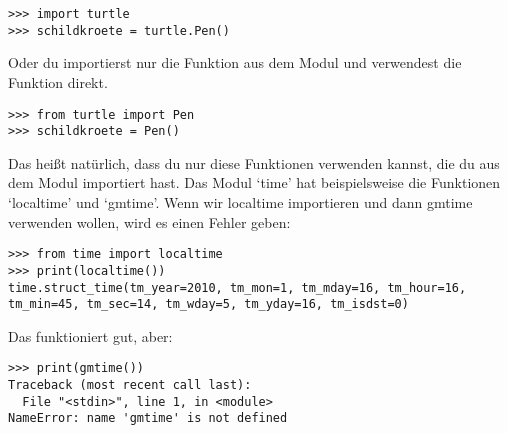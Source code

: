 \begin{Verbatim}[frame=single]
>>> import turtle
>>> schildkroete = turtle.Pen()
\end{Verbatim}

Oder du importierst nur die  Funktion aus dem Modul und verwendest die Funktion direkt.

\begin{Verbatim}[frame=single]
>>> from turtle import Pen
>>> schildkroete = Pen()
\end{Verbatim}

Das heißt natürlich, dass du nur diese Funktionen verwenden kannst, die du aus dem Modul importiert hast. Das Modul `time' hat beispielsweise die Funktionen `localtime' und `gmtime'. Wenn wir localtime importieren und dann gmtime verwenden wollen, wird es einen Fehler geben: 

\begin{Verbatim}[frame=single]
>>> from time import localtime
>>> print(localtime())
time.struct_time(tm_year=2010, tm_mon=1, tm_mday=16, tm_hour=16, 
tm_min=45, tm_sec=14, tm_wday=5, tm_yday=16, tm_isdst=0)
\end{Verbatim}

\noindent
Das funktioniert gut, aber:

\begin{Verbatim}[frame=single]
>>> print(gmtime())
Traceback (most recent call last):
  File "<stdin>", line 1, in <module>
NameError: name 'gmtime' is not defined
\end{Verbatim}

